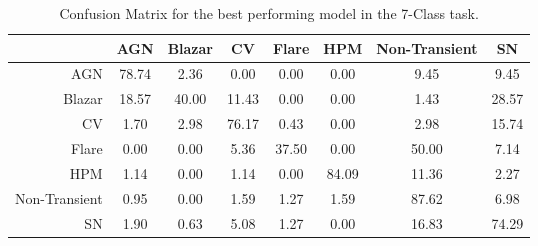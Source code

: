 \begin{table*}
\centering
\begin{tabular}{|r|c|c|c|c|c|c|c|}
\hline
\multicolumn{1}{|l|}{} & AGN    & Blazar    & CV   & Flare   & HPM   & Non-Transient   & SN \\ \hline \hline
AGN                & 78.74       & 2.36       & 0.00      & 0.00      & 0.00      & 9.45      & 9.45      \\ \hline
Blazar                & 18.57       & 40.00       & 11.43      & 0.00      & 0.00      & 1.43      & 28.57          \\ \hline
CV                & 1.70       & 2.98       & 76.17      & 0.43      & 0.00      & 2.98      & 15.74          \\ \hline
Flare                & 0.00       & 0.00       & 5.36      & 37.50      & 0.00      & 50.00      & 7.14          \\ \hline
HPM                & 1.14       & 0.00       & 1.14      & 0.00      & 84.09      & 11.36      & 2.27          \\ \hline
Non-Transient                & 0.95       & 0.00       & 1.59      & 1.27      & 1.59      & 87.62      & 6.98          \\ \hline
SN                & 1.90       & 0.63       & 5.08      & 1.27      & 0.00      & 16.83      & 74.29          \\ \hline
\end{tabular}
\caption{Confusion Matrix for the best performing model in the 7-Class task.}
\label{Confusion-7-Class}
\end{table*}
